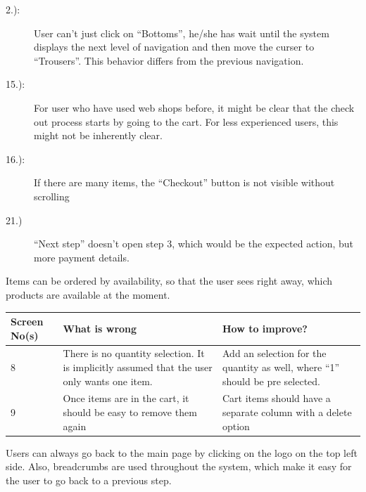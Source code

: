 \begin{description}
\item[2.):] User can't just click on ``Bottoms'', he/she has wait until the system displays the next level of navigation and then move the curser to ``Trousers''. This behavior differs from the previous navigation. 
\item[15.):] For user who have used web shops before, it might be clear that the check out process starts by going to the cart. For less experienced users, this might not be inherently clear.
\item[16.):] If there are many items, the ``Checkout'' button is not visible without scrolling
\item[21.)] ``Next step'' doesn't open step 3, which would be the expected action, but more payment details. 
\end{description}

\begin{large}
\end{large}
Items can be ordered by availability, so that the user sees right away, which products are available at the moment. 




\begin{table}[htdp]
\begin{center}
\begin{tabular}{|p{2cm}|p{6.5cm}|p{6.5cm}|}
\hline
\textbf{Screen No(s)} & \textbf{What is wrong} & \textbf{How to improve?} \\
\hline
8 & There is no quantity selection. It is implicitly assumed that the user only wants one item. & Add an selection for the quantity as well, where ``1'' should be pre selected. \\
\hline
9 & Once items are in the cart, it should be easy to remove them again & Cart items should have a separate column with a delete option\\
\hline
\end{tabular}
\end{center}
\label{3_heurisitcs_eval}
\end{table}

Users can always go back to the main page by clicking on the logo on the top left side. Also, breadcrumbs are used throughout the system, which make it easy for the user to go back to a previous step. 

